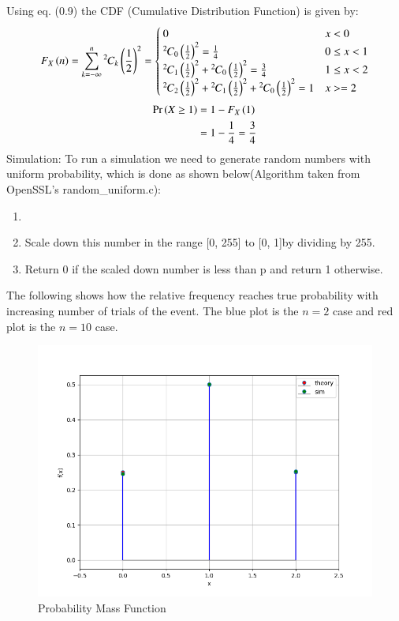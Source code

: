 \documentclass[journal]{IEEEtran}
\begin{document}
Using eq. (0.9) the CDF (Cumulative Distribution Function) is given by:
\begin{align}
  F_{X}\left(n\right) = \sum_{k = -\infty}^n{{}^{2}\mkern-1muC_{k}}\left(\frac{1}{2}\right)^2 = \begin{cases}
    0 & x < 0\\
    {{}^{2}\mkern-1muC_{0}}\left(\frac{1}{2}\right)^2 = \frac{1}{4} & 0 \le x < 1\\
    {{}^{2}\mkern-1muC_{1}}\left(\frac{1}{2}\right)^2 + {{}^{2}\mkern-1muC_{0}}\left(\frac{1}{2}\right)^2 = \frac{3}{4}& 1 \le x < 2\\
    {{}^{2}\mkern-1muC_{2}}\left(\frac{1}{2}\right)^2 + {{}^{2}\mkern-1muC_{1}}\left(\frac{1}{2}\right)^2 + {{}^{2}\mkern-1muC_{0}}\left(\frac{1}{2}\right)^2 = 1 & x >=2\\
  \end{cases}
\end{align}
\begin{align}
  \Pr\left(X \ge 1\right) &= 1 - F_X\left(1\right)\\
  &= 1 - \frac{1}{4} = \frac{3}{4}
\end{align}
Simulation:
\newline
To run a simulation we need to generate random numbers with uniform probability, which is done
as shown below(Algorithm taken from OpenSSL's random\_uniform.c):
\begin{enumerate}
  \item {}
  \item Scale down this number in the range [0, 255] to [0, 1]by dividing by 255.
  \item Return 0 if the scaled down number is less than p and return 1 otherwise. 
\end{enumerate}
The following shows how the relative frequency reaches true probability with increasing number of trials of the event. The blue plot is the $n = 2$ case and red plot is the $n = 10$ case.
\begin{figure}[h!]
   \centering
   \includegraphics[width=0.7\columnwidth]{figs/fig1.png}
    \caption{Probability Mass Function}
\end{figure}
\end{document}
